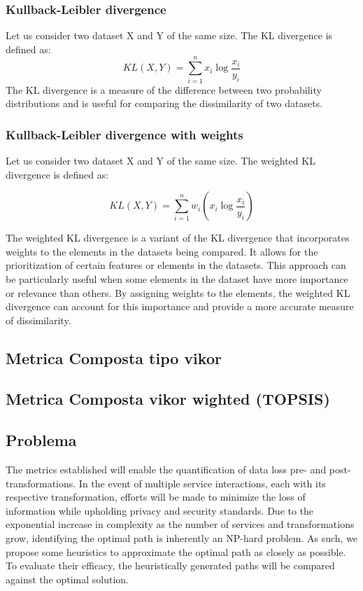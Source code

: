 \subsubsection{Kullback-Leibler divergence} Let us consider two dataset X and Y of the same size. The KL divergence is defined as:\[KL(X,Y) = \sum_{i=1}^{n}x_i \log \frac{x_i}{y_i}\]
The KL divergence is a measure of the difference between two probability distributions and is useful for comparing the dissimilarity of two datasets.


\subsubsection{Kullback-Leibler divergence with weights} Let us consider two dataset X and Y of the same size. The weighted KL divergence is defined as:

\[KL(X,Y) = \sum_{i=1}^{n}w_i(x_i \log \frac{x_i}{y_i})\]

The weighted KL divergence is a variant of the KL divergence that incorporates weights to the elements in the datasets being compared.
It allows for the prioritization of certain features or elements in the datasets.
This approach can be particularly useful when some elements in the dataset have more importance or relevance than others.
By assigning weights to the elements, the weighted KL divergence can account for this importance and provide a more accurate measure of dissimilarity.


\subsection{Metrica Composta tipo vikor}
\subsection{Metrica Composta vikor wighted (TOPSIS)}

\subsection{Problema}
The metrics established will enable the quantification of data loss pre- and post-transformations.
In the event of multiple service interactions, each with its respective transformation, efforts will be made to minimize the loss of information while upholding privacy and security standards.
Due to the exponential increase in complexity as the number of services and transformations grow, identifying the optimal path is inherently an NP-hard problem.
As such, we propose some heuristics to approximate the optimal path as closely as possible. To evaluate their efficacy, the heuristically generated paths will be compared against the optimal solution.
